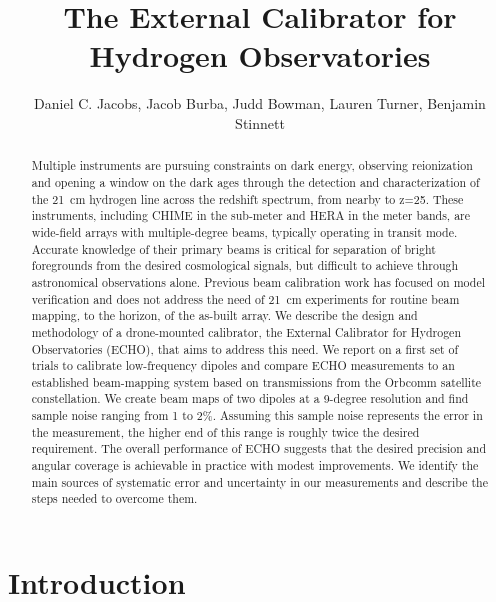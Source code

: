 \documentclass[preprint2,numberedappendix,tighten,twocolappendix]{aastex6}
\begin{document}
\title{The External Calibrator for Hydrogen Observatories}


\author{
Daniel C. Jacobs,
Jacob Burba,
Judd Bowman,
Lauren Turner,
Benjamin Stinnett
}



\begin{abstract}
Multiple instruments are pursuing constraints on dark energy, observing reionization and opening a window on the dark ages through the detection and characterization of the 21~cm hydrogen line across the redshift spectrum, from nearby to z=25.  These instruments, including CHIME in the sub-meter and HERA in the meter bands, are wide-field arrays with multiple-degree beams, typically operating in transit mode.  Accurate knowledge of their primary beams is critical for separation of bright foregrounds from the desired cosmological signals, but difficult to achieve through astronomical observations alone.  Previous beam calibration work has focused on model verification and does not address the need of 21~cm experiments for routine beam mapping, to the horizon, of the as-built array.  We describe the design and methodology of a drone-mounted calibrator, the External Calibrator for Hydrogen Observatories (ECHO), that aims to address this need. We report on a first set of trials to calibrate low-frequency dipoles and compare ECHO measurements to an established beam-mapping system based on transmissions from the Orbcomm satellite constellation.  We create beam maps of two dipoles at a  9-degree resolution and find sample noise ranging from 1 to  2\%.  Assuming this sample noise represents the error in the measurement, the higher end of this range is roughly twice the desired requirement.  The overall performance of ECHO suggests that the desired precision and angular coverage is achievable in practice with modest improvements. We identify the main sources of systematic error and uncertainty in our measurements and describe the steps needed to overcome them.
\end{abstract}




\section{Introduction}\label{sec:intro}
\end{document}
